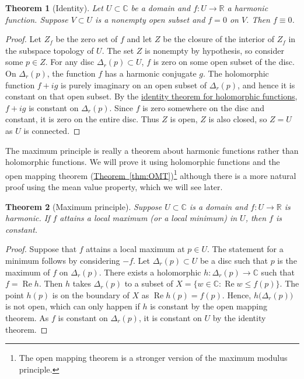 \documentclass[12pt,openany]{book}
\renewcommand{\Re}{\operatorname{Re}}
\newcommand{\C}{{\mathbb{C}}}
\newcommand{\R}{{\mathbb{R}}}
\theoremstyle{plain}
\newtheorem{thm}{Theorem}[section]
\theoremstyle{remark}
\theoremstyle{definition}
\theoremstyle{exercise}
\theoremstyle{example}
\newcommand{\thmref}[1]{\hyperref[#1]{Theorem~\ref*{#1}}}
\begin{document}
\begin{thm}[Identity]
Let $U \subset \C$ be a domain and $f \colon U \to \R$ a harmonic function.
Suppose $V \subset U$ is a nonempty open subset and $f = 0$ on $V$.  Then $f
\equiv 0$.
\end{thm}

\begin{proof}
Let $Z_f$ be the zero set of $f$ and let $Z$ be the closure of the interior
of $Z_f$ in the subspace topology of $U$.
The set $Z$ is nonempty by hypothesis, so
consider some $p \in Z$.  For any disc $\Delta_r(p) \subset U$, $f$ is
zero on some open subset of the disc.  On $\Delta_r(p)$, the function
$f$ has a harmonic
conjugate $g$.
The holomorphic function $f+i g$ is purely imaginary on
an open subset of $\Delta_r(p)$, and hence it is constant on that open subset.
By the \hyperref[thm:identity]{identity theorem for holomorphic functions},
$f+ig$ is constant 
on $\Delta_r(p)$.
Since $f$ is zero somewhere on the
disc and constant, it is zero on the entire disc.  Thus $Z$
is open, $Z$ is also closed, so $Z=U$ as $U$ is connected.
\end{proof}

The maximum principle is really a theorem about harmonic functions rather
than holomorphic functions.  We will prove it using holomorphic functions
and the open mapping theorem (\thmref{thm:OMT})\footnote{%
The open mapping theorem is a stronger version of the maximum modulus principle.}
although there is a more natural proof using the mean value property,
which we will see later.

\begin{thm}[Maximum principle]
%
Suppose $U \subset \C$ is a domain and $f \colon U \to \R$
is harmonic.  If $f$ attains a local maximum (or a local minimum) in $U$, then $f$ is constant.
\end{thm}

\begin{proof}
Suppose that $f$ attains a local maximum at $p \in U$.
The statement for a minimum follows by considering $-f$.
Let $\Delta_r(p) \subset U$
be a disc such that $p$ is the maximum of $f$ on $\Delta_r(p)$.
There exists a holomorphic $h \colon \Delta_r(p) \to \C$
such that $f = \Re h$.
Then $h$ takes
$\Delta_r(p)$ to a subset of $X = \bigl\{ w \in \C : \Re w \leq f(p) \bigr\}$.
The point $h(p)$ is on the boundary of $X$ as $\Re h(p)= f(p)$.  Hence,
$h\bigl(\Delta_r(p)\bigr)$ is not open, which can only happen if $h$ is
constant by the open mapping theorem.  As $f$ is constant on $\Delta_r(p)$, it is constant on $U$ by the
identity theorem.
\end{proof}
\end{document}
